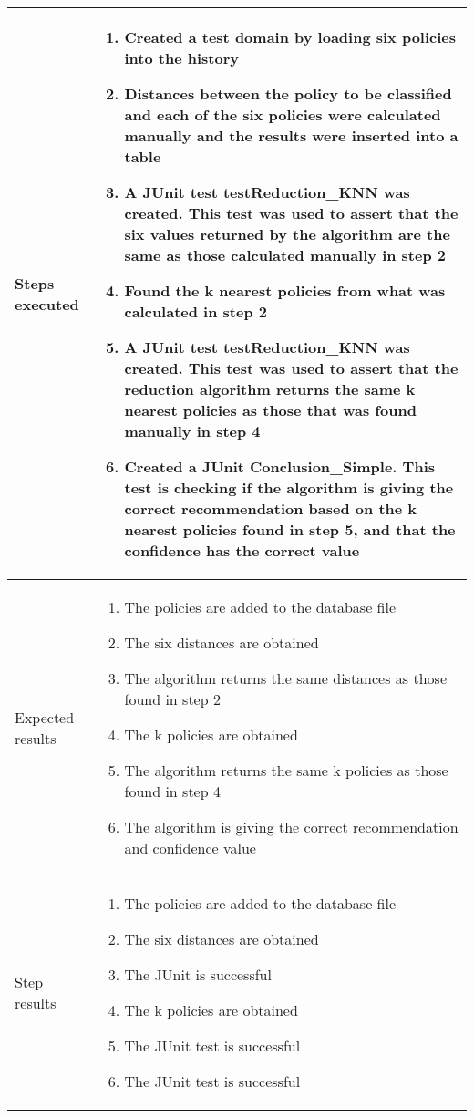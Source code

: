 \begin{center}
\begin{longtable}{ | p{4cm} | p{10cm} | }
			Steps executed & 	\begin{enumerate}
							\item Created a test domain by loading six policies into the history
							\item Distances between the policy to be classified and each of the six policies were calculated manually and the results were inserted into a table
							\item A JUnit test testReduction\_KNN was created. This test was used to assert that the six values returned by the algorithm are the same as those calculated manually in step 2
							\item Found the k nearest policies from what was calculated in step 2
							\item A JUnit test testReduction\_KNN was created. This test was used to assert that the reduction algorithm returns the same k nearest policies as those that was found manually in step 4
							\item Created a JUnit Conclusion\_Simple. This test is checking if the algorithm is giving the correct recommendation based on the k nearest policies found in step 5, and that the confidence has the correct value
						\end{enumerate} \\ [3pt] \hline
			
			Expected results &	\begin{enumerate}
							\item The policies are added to the database file
							\item The six distances are obtained
							\item The algorithm returns the same distances as those found in step 2
							\item The k policies are obtained
							\item The algorithm returns the same k policies as those found in step 4
							\item The algorithm is giving the correct recommendation and confidence value
						\end{enumerate}
							 \\  [3pt] \hline

			Step results & 	\begin{enumerate}
							\item The policies are added to the database file
							\item The six distances are obtained
							\item The JUnit is successful
							\item The k policies are obtained
							\item The JUnit test is successful
							\item The JUnit test is successful
						\end{enumerate}
							 \\  [3pt] \hline


\end{longtable}
\end{center}
